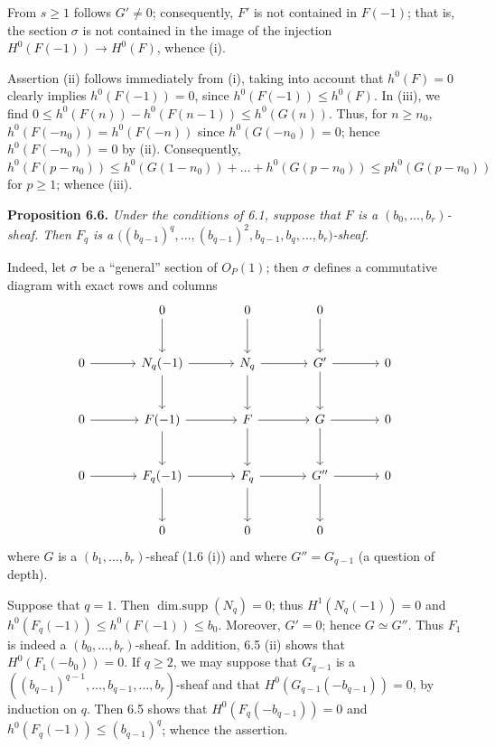 %
From $s\ge1$ follows $G'\ne0$; consequently, $F'$ is not contained in $F(-1)$; that is, the section $\sigma$ is not contained in the image of the injection $H^0(F(-1))\to H^0(F)$, whence (i).

Assertion (ii) follows immediately from (i), taking into account that $h^0(F)=0$ clearly implies $h^0(F(-1))=0$, since $h^0(F(-1))\le h^0(F)$. In (iii), we find $0\le h^0(F(n))-h^0(F(n-1))\le h^0(G(n))$. Thus, for $n\ge n_0$, $h^0(F(-n_0))=h^0(F(-n))$ since $h^0(G(-n_0))=0$; hence $h^0(F(-n_0))=0$ by (ii). Consequently, $h^0(F(p-n_0))\le h^0(G(1-n_0))+\ldots+h^0(G(p-n_0))\le ph^0(G(p-n_0))$ for $p\ge1$; whence (iii).

\textbf{Proposition 6.6.} \emph{Under the conditions of 6.1, suppose that $F$ is a $(b_0,\ldots,b_r)$-sheaf. Then $F_q$ is a $\bigl((b_{q-1})^q,\ldots,(b_{q-1})^2,b_{q-1},b_q,\ldots,b_r\bigr)$-sheaf.}

Indeed, let $\sigma$ be a ``general'' section of ${O}_P(1)$; then $\sigma$ defines a commutative diagram with exact rows and columns
\[
\begin{tikzcd}[column sep=large,row sep=large]
&0 \arrow[d]&0 \arrow[d]&0 \arrow[d]&\\
0 \arrow[r]&N_q(-1) \arrow[r] \arrow[d]&N_q \arrow[r] \arrow[d]&G' \arrow[r] \arrow[d]&0\\
0 \arrow[r]&F(-1) \arrow[r] \arrow[d]&F \arrow[r] \arrow[d]&G \arrow[r] \arrow[d]&0\\
0 \arrow[r]&F_q(-1) \arrow[r] \arrow[d]&F_q \arrow[r] \arrow[d]&G'' \arrow[r] \arrow[d]&0\\
&0&0&0&
\end{tikzcd}
\]
where $G$ is a $(b_1,\ldots,b_r)$-sheaf (1.6 (i)) and where $G''=G_{q-1}$ (a question of depth).

%
Suppose that $q=1$. Then $\operatorname{dim{.}supp}(N_q)=0$; thus $H^1(N_q(-1))=0$ and $h^0(F_q(-1))\le h^0(F(-1))\le b_0$. Moreover, $G'=0$; hence $G\simeq G''$. Thus $F_1$ is indeed a $(b_0,\ldots,b_r)$-sheaf. In addition, 6.5 (ii) shows that $H^0(F_1(-b_0))=0$. If $q\ge2$, we may suppose that $G_{q-1}$ is a $((b_{q-1})^{q-1},\ldots,b_{q-1},\ldots,b_r)$-sheaf and that $H^0(G_{q-1}(-b_{q-1}))=0$, by induction on $q$. Then 6.5 shows that $H^0(F_q(-b_{q-1}))=0$ and $h^0(F_q(-1))\le (b_{q-1})^q$; whence the assertion.

